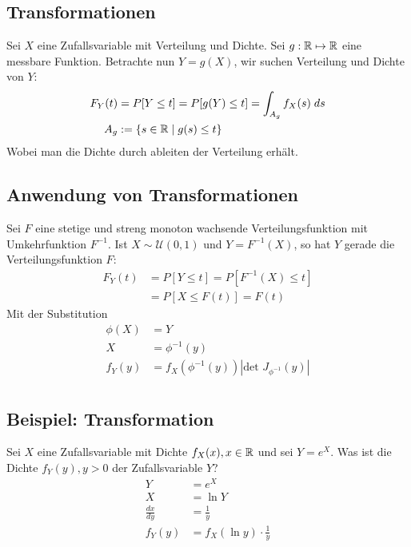 \subsection{Transformationen}
Sei $X$ eine Zufallsvariable mit Verteilung und Dichte. Sei $g: \mathbb{R} \mapsto \mathbb{R}$
eine messbare Funktion. Betrachte nun $Y = g (X)$, wir suchen Verteilung und
Dichte von $Y$:
\begin{align*}
  F_Y (t) & = P[Y \leq t] = P[g (Y) \leq t] = \int_{A_g} f_X (s) \; ds \\
  A_g     & := \{s \in \mathbb{R} \; | \; g (s) \leq t\}
\end{align*}
Wobei man die Dichte durch ableiten der Verteilung erhält.
\subsection{Anwendung von Transformationen}
Sei $F$ eine stetige und streng monoton wachsende Verteilungsfunktion mit
Umkehrfunktion $F^{-1}$. Ist $X \sim \mathcal{U} (0, 1)$ und $Y = F^{-1} (X)$,
so hat $Y$ gerade die Verteilungsfunktion $F$:
\begin{align*}
  F_Y (t) & = P[Y \leq t] = P[F^{-1} (X) \leq t] \\
          & = P[X \leq F (t)] = F (t)
\end{align*}
Mit der Substitution
\begin{align*}
  \phi(X) & = Y                                              \\
  X       & = \phi^{-1}(y)                                   \\
  f_Y(y)  & = f_X(\phi^{-1}(y))|\text{det }J_{\phi^{-1}}(y)| \\
\end{align*}
\BoxStart{}
\subsection{Beispiel: Transformation}
Sei $X$ eine Zufallsvariable mit Dichte $f_X(x), x \in \mathbb{R}$ und sei $Y = e^X$. Was ist die Dichte $f_Y(y), y > 0$ der Zufallsvariable $Y$?
\begin{align*}
  Y             & = e^X                          \\
  X             & = \ln Y                        \\
  \frac{dx}{dy} & = \frac{1}{y}                  \\
  f_Y(y)        & = f_X(\ln y) \cdot \frac{1}{y} \\
\end{align*}

\BoxEnd{}
